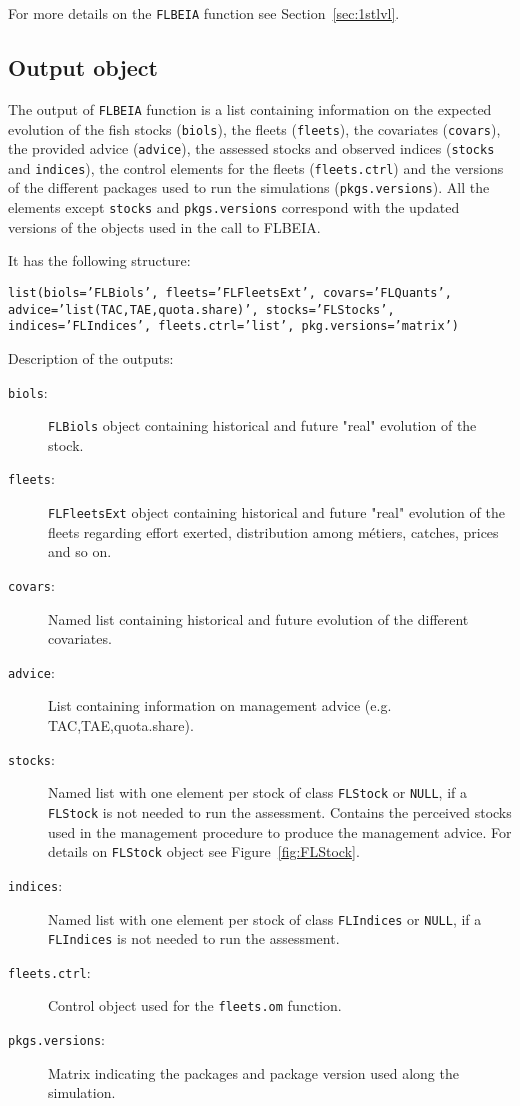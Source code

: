   For more details on the \texttt{FLBEIA} function see Section~\ref{sec:1stlvl}.

\subsection{Output object}

  The output of \texttt{FLBEIA} function is a list containing information on the expected evolution of the fish stocks (\texttt{biols}), the fleets 
  (\texttt{fleets}), the covariates (\texttt{covars}), the provided advice (\texttt{advice}), the assessed stocks and observed indices 
  (\texttt{stocks} and \texttt{indices}), the control elements for the fleets (\texttt{fleets.ctrl}) and the versions of the different packages
  used to run the simulations (\texttt{pkgs.versions}). All the elements except \texttt{stocks} and \texttt{pkgs.versions} correspond with the
  updated versions of the objects used in the call to FLBEIA. 
  
  \noindent It has the following structure:
  \begin{center}
    \texttt{list(biols='FLBiols', fleets='FLFleetsExt', covars='FLQuants', advice='list(TAC,TAE,quota.share)', 
            stocks='FLStocks', indices='FLIndices', fleets.ctrl='list', pkg.versions='matrix') }
  \end{center}
  
  \noindent Description of the outputs:
    \begin{description}
      \item[\texttt{biols}:] \texttt{FLBiols} object containing historical and future "real" evolution of the stock.     
      \item[\texttt{fleets}:] \texttt{FLFleetsExt} object containing historical and future "real" evolution of the fleets 
  regarding effort exerted, distribution among m\'etiers, catches, prices and so on.
      \item[\texttt{covars}:] Named list containing historical and future evolution of the different covariates.     
      \item[\texttt{advice}:] List containing information on management advice (e.g. TAC,TAE,quota.share).     
      \item[\texttt{stocks}:] Named list with one element per stock of class \texttt{FLStock} or \texttt{NULL}, if a \texttt{FLStock} is not needed to run the assessment.
          Contains the perceived stocks used in the management procedure to produce the management advice.
          For details on \texttt{FLStock} object see Figure~\ref{fig:FLStock}.
      \item[\texttt{indices}:] Named list with one element per stock of class \texttt{FLIndices} or \texttt{NULL}, if a \texttt{FLIndices} is not needed to run the assessment. 
      \item[\texttt{fleets.ctrl}:] Control object used for the \texttt{fleets.om} function.
      \item[\texttt{pkgs.versions}:] Matrix indicating the packages and package version used along the simulation.
    \end{description}
